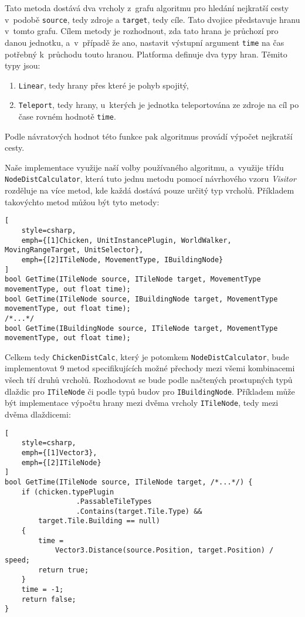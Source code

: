 Tato metoda dostává dva vrcholy z~grafu algoritmu pro hledání nejkratší cesty v~podobě \texttt{source}, tedy zdroje a \texttt{target}, tedy cíle. Tato dvojice představuje hranu v~tomto grafu. Cílem metody je rozhodnout, zda tato hrana je průchozí pro danou jednotku, a~v~případě že ano, nastavit výstupní argument \texttt{time} na čas potřebný k~průchodu touto hranou. Platforma definuje dva typy hran. Těmito typy jsou:
\begin{enumerate}
	\item \texttt{Linear}, tedy hrany přes které je pohyb spojitý,
	\item \texttt{Teleport}, tedy hrany, u~kterých je jednotka teleportována ze zdroje na cíl po čase rovném hodnotě \texttt{time}.
\end{enumerate}

Podle návratových hodnot této funkce pak algoritmus provádí výpočet nejkratší cesty. 

Naše implementace využije naší volby používaného algoritmu, a~využije třídu \texttt{NodeDistCalculator}, která tuto jednu metodu pomocí návrhového vzoru \textit{Visitor} rozděluje na více metod, kde každá dostává pouze určitý typ vrcholů. Příkladem takovýchto metod můžou být tyto metody:

\begin{lstlisting}[
	style=csharp,
	emph={[1]Chicken, UnitInstancePlugin, WorldWalker, MovingRangeTarget, UnitSelector},
	emph={[2]ITileNode, MovementType, IBuildingNode}
]
bool GetTime(ITileNode source, ITileNode target, MovementType movementType, out float time);
bool GetTime(ITileNode source, IBuildingNode target, MovementType movementType, out float time);
/*...*/
bool GetTime(IBuildingNode source, ITileNode target, MovementType movementType, out float time);
\end{lstlisting}

Celkem tedy \texttt{ChickenDistCalc}, který je potomkem \texttt{NodeDistCalculator}, bude implementovat 9 metod specifikujících možné přechody mezi všemi kombinacemi všech tří druhů vrcholů. Rozhodovat se bude podle načtených prostupných typů dlaždic pro \texttt{ITileNode} či podle typů budov pro \texttt{IBuildingNode}. Příkladem může být implementace výpočtu hrany mezi dvěma vrcholy \texttt{ITileNode}, tedy mezi dvěma dlaždicemi:

\begin{lstlisting}[
	style=csharp,
	emph={[1]Vector3},
	emph={[2]ITileNode}
]
bool GetTime(ITileNode source, ITileNode target, /*...*/) {
	if (chicken.typePlugin
                 .PassableTileTypes
                 .Contains(target.Tile.Type) &&
        target.Tile.Building == null) 
    {
		time = 
			Vector3.Distance(source.Position, target.Position) / speed;
		return true;
	}
	time = -1;
	return false;
}
\end{lstlisting}

